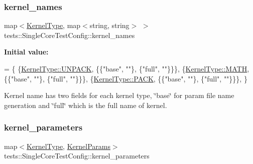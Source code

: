 \subsubsection{\texorpdfstring{kernel\+\_\+names}{kernel\_names}}
{\footnotesize\ttfamily map$<$\hyperlink{namespacetests_a4f360b8af533762256ff97513bfd6a0d}{Kernel\+Type}, map$<$string, string$>$ $>$ tests\+::\+Single\+Core\+Test\+Config\+::kernel\+\_\+names}

{\bfseries Initial value\+:}
\begin{DoxyCode}
= \{
      \{\hyperlink{namespacetests_a4f360b8af533762256ff97513bfd6a0daba3bbf795bfdbe156772d8f44833a3af}{KernelType::UNPACK}, \{\{\textcolor{stringliteral}{"base"}, \textcolor{stringliteral}{""}\}, \{\textcolor{stringliteral}{"full"}, \textcolor{stringliteral}{""}\}\}\},
      \{\hyperlink{namespacetests_a4f360b8af533762256ff97513bfd6a0da7b849aa2899a63a2da359bf9a0b5b0af}{KernelType::MATH}, \{\{\textcolor{stringliteral}{"base"}, \textcolor{stringliteral}{""}\}, \{\textcolor{stringliteral}{"full"}, \textcolor{stringliteral}{""}\}\}\},
      \{\hyperlink{namespacetests_a4f360b8af533762256ff97513bfd6a0daa484d944b59301977fbe221d69d58857}{KernelType::PACK}, \{\{\textcolor{stringliteral}{"base"}, \textcolor{stringliteral}{""}\}, \{\textcolor{stringliteral}{"full"}, \textcolor{stringliteral}{""}\}\}\},
  \}
\end{DoxyCode}


Kernel name has two fields for each kernel type, \char`\"{}base\char`\"{} for param file name generation and \char`\"{}full\char`\"{} which is the full name of kernel. 

\mbox{\label{structtests_1_1SingleCoreTestConfig_a7d92aead3b33ee501ebce274d164e8df}} 
\subsubsection{\texorpdfstring{kernel\+\_\+parameters}{kernel\_parameters}}
{\footnotesize\ttfamily map$<$\hyperlink{namespacetests_a4f360b8af533762256ff97513bfd6a0d}{Kernel\+Type}, \hyperlink{structtests_1_1KernelParams}{Kernel\+Params}$>$ tests\+::\+Single\+Core\+Test\+Config\+::kernel\+\_\+parameters}

